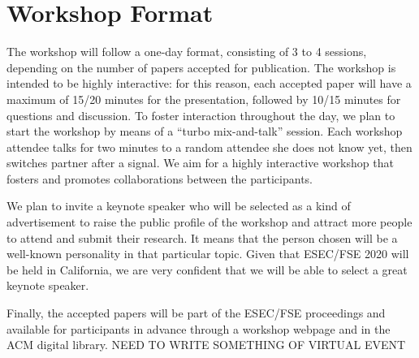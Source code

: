 
\section{Workshop Format}
\label{sec:format}

The workshop will follow a one-day format, consisting of 3 to 4 sessions, depending on the number of papers accepted for publication.
The workshop is intended to be highly interactive: for this reason, each accepted paper will have a maximum of 15/20 minutes for the presentation, followed by 10/15 minutes for questions and discussion.
To foster interaction throughout the day, we plan to start the workshop by means of a “turbo mix-and-talk” session. Each workshop attendee talks for two minutes to a random attendee she does not know yet, then switches partner after a signal. We aim for a highly interactive workshop that fosters and promotes collaborations between the participants. %

We plan to invite a keynote speaker who will be selected as a kind of advertisement to raise the public profile of the workshop and attract more people to attend and submit their research. It means that the person chosen will be a well-known personality in that particular topic. Given that ESEC/FSE 2020 will be held in California, we are very confident that we will be able to select a great keynote speaker.

Finally, the accepted papers will be part of the ESEC/FSE proceedings and available for participants in advance through a workshop webpage and in the ACM digital library.
NEED TO WRITE SOMETHING OF VIRTUAL EVENT
